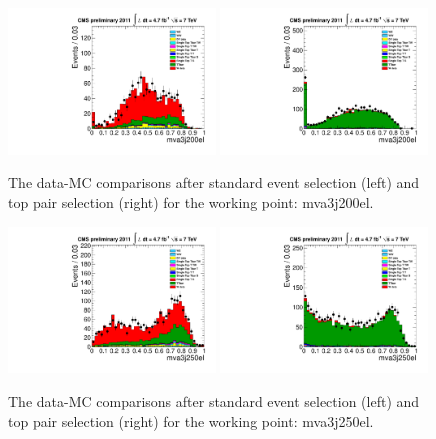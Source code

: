 \begin{figure}[!t]
  \centering
  \includegraphics[width=0.49\textwidth]{figs/cl-mva3j200el-normal.pdf}
  \includegraphics[width=0.49\textwidth]{figs/cl-mva3j200el-inTTbar.pdf}
  \caption{\label{fig:mva:plots-mva3j200el} The data-MC comparisons
    after standard event selection (left) and top pair
    selection (right) for the working point: mva3j200el.}
\end{figure}

\begin{figure}[!t]
  \centering
  \includegraphics[width=0.49\textwidth]{figs/cl-mva3j250el-normal.pdf}
  \includegraphics[width=0.49\textwidth]{figs/cl-mva3j250el-inTTbar.pdf}
  \caption{\label{fig:mva:plots-mva3j250el} The data-MC comparisons
    after standard event selection (left) and top pair
    selection (right) for the working point: mva3j250el.}
\end{figure}

